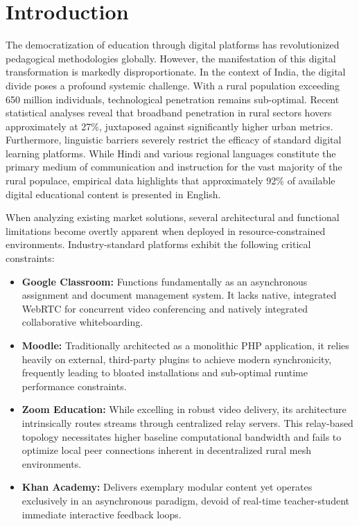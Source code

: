 \documentclass[12pt, journal, onecolumn]{IEEEtran}
\begin{document}
\section{Introduction}
The democratization of education through digital platforms has revolutionized pedagogical methodologies globally. However, the manifestation of this digital transformation is markedly disproportionate. In the context of India, the digital divide poses a profound systemic challenge. With a rural population exceeding 650 million individuals, technological penetration remains sub-optimal. Recent statistical analyses reveal that broadband penetration in rural sectors hovers approximately at 27\%, juxtaposed against significantly higher urban metrics. Furthermore, linguistic barriers severely restrict the efficacy of standard digital learning platforms. While Hindi and various regional languages constitute the primary medium of communication and instruction for the vast majority of the rural populace, empirical data highlights that approximately 92\% of available digital educational content is presented in English.

When analyzing existing market solutions, several architectural and functional limitations become overtly apparent when deployed in resource-constrained environments. Industry-standard platforms exhibit the following critical constraints:
\begin{itemize}
    \item \textbf{Google Classroom:} Functions fundamentally as an asynchronous assignment and document management system. It lacks native, integrated WebRTC for concurrent video conferencing and natively integrated collaborative whiteboarding.
    \item \textbf{Moodle:} Traditionally architected as a monolithic PHP application, it relies heavily on external, third-party plugins to achieve modern synchronicity, frequently leading to bloated installations and sub-optimal runtime performance constraints.
    \item \textbf{Zoom Education:} While excelling in robust video delivery, its architecture intrinsically routes streams through centralized relay servers. This relay-based topology necessitates higher baseline computational bandwidth and fails to optimize local peer connections inherent in decentralized rural mesh environments.
    \item \textbf{Khan Academy:} Delivers exemplary modular content yet operates exclusively in an asynchronous paradigm, devoid of real-time teacher-student immediate interactive feedback loops.
\end{itemize}
\end{document}
